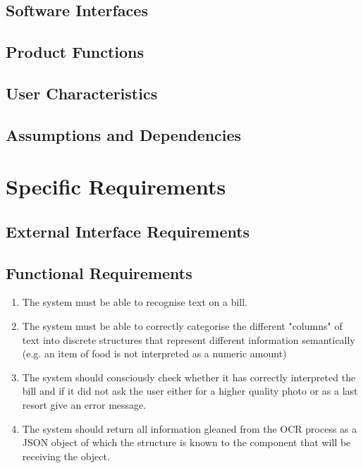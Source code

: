 \documentclass[12pt,a4paper]{article}
\begin{document}
   	\subsection{Software Interfaces}
   	\subsection{Product Functions}
	\subsection{User Characteristics}   	
   	\subsection{Assumptions and Dependencies}

   \section{Specific Requirements}
	\subsection{External Interface Requirements}
	
	\subsection{Functional Requirements}
	
		\begin{enumerate}
				\item The system must be able to recognise text on a bill.
				\item The system must be able to correctly categorise the different "columns" of text into discrete structures that represent different information semantically (e.g. an item of food is not interpreted as a numeric amount)
				\item The system should consciously check whether it has correctly interpreted the bill and if it did not ask the user either for a higher quality photo or as a last resort give an error message. 
				\item The system should return all information gleaned from the OCR process as a JSON object of which the structure is known to the component that will be receiving the object.
			\end{enumerate}
\end{document}
